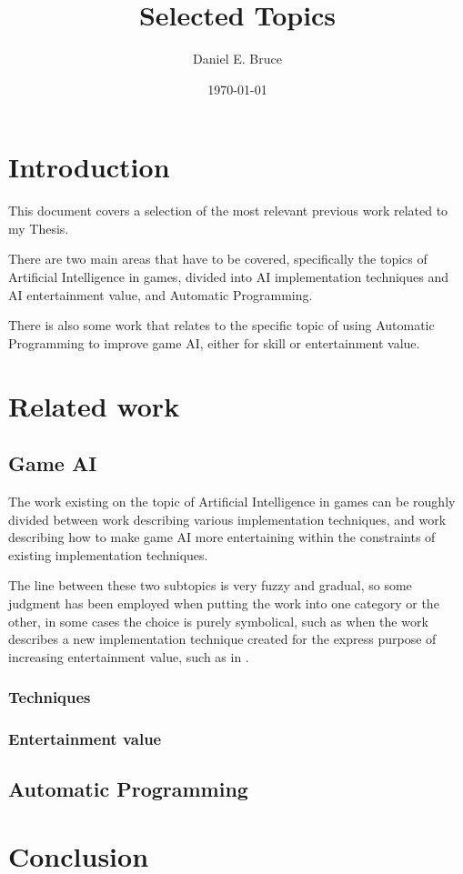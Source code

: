 \documentclass[]{report}
\begin{document}
\title{Selected Topics}
\author{Daniel E. Bruce}
\date{\today}
\maketitle

\tableofcontents

\chapter{Introduction}

This document covers a selection of the most relevant previous work related to
my Thesis.

There are two main areas that have to be covered, specifically the topics of
Artificial Intelligence in games, divided into AI implementation techniques and
AI entertainment value, and Automatic Programming.

There is also some work that relates to the specific topic of using Automatic
Programming to improve game AI, either for skill or entertainment value.

\chapter{Related work}
\label{cha:related-work}

\section{Game AI}
\label{cha:conclusion}

The work existing on the topic of Artificial Intelligence in games can be roughly
divided between work describing various implementation techniques, and work
describing how to make game AI more entertaining within the constraints of
existing implementation techniques.

The line between these two subtopics is very fuzzy and gradual, so some
judgment has been employed when putting the work into one category or the other,
in some cases the choice is purely symbolical, such as when the work describes a
new implementation technique created for the express purpose of increasing
entertainment value, such as in \citet{Mateas02}.

\subsection{Techniques}
\label{sec:techniques}

\subsection{Entertainment value}
\label{sec:entertainment-value}

\section{Automatic Programming}
\label{cha:autom-progr}

\chapter{Conclusion}
\label{cha:conclusion-1}



\end{document}
